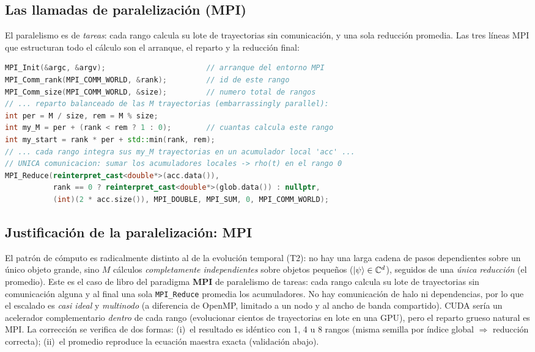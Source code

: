 \subsection{Las llamadas de paralelización (MPI)}
El paralelismo es de \emph{tareas}: cada rango calcula su lote de trayectorias sin
comunicación, y una sola reducción promedia. Las tres líneas MPI que estructuran
todo el cálculo son el arranque, el reparto y la reducción final:

\begin{lstlisting}[language=C++,caption={Esqueleto MPI de \texttt{trajectories\_mpi.cpp}: arranque e identificación del rango, reparto balanceado de las $M$ trayectorias entre rangos (sin comunicación), y la \emph{única} operación colectiva \texttt{MPI\_Reduce} que suma los acumuladores en el rango 0 (Paso~3, el promedio).},label={lst:t3_mpi}]
MPI_Init(&argc, &argv);                       // arranque del entorno MPI
MPI_Comm_rank(MPI_COMM_WORLD, &rank);         // id de este rango
MPI_Comm_size(MPI_COMM_WORLD, &size);         // numero total de rangos
// ... reparto balanceado de las M trayectorias (embarrassingly parallel):
int per = M / size, rem = M % size;
int my_M = per + (rank < rem ? 1 : 0);        // cuantas calcula este rango
int my_start = rank * per + std::min(rank, rem);
// ... cada rango integra sus my_M trayectorias en un acumulador local 'acc' ...
// UNICA comunicacion: sumar los acumuladores locales -> rho(t) en el rango 0
MPI_Reduce(reinterpret_cast<double*>(acc.data()),
           rank == 0 ? reinterpret_cast<double*>(glob.data()) : nullptr,
           (int)(2 * acc.size()), MPI_DOUBLE, MPI_SUM, 0, MPI_COMM_WORLD);
\end{lstlisting}

\subsection{Justificación de la paralelización: MPI}
El patrón de cómputo es radicalmente distinto al de la evolución temporal (T2):
no hay una larga cadena de pasos dependientes sobre un único objeto grande, sino
$M$ cálculos \emph{completamente independientes} sobre objetos pequeños
($\ket\psi\in\mathbb{C}^d$), seguidos de una \emph{única reducción} (el promedio).
Este es el caso de libro del paradigma \textbf{MPI} de paralelismo de tareas:
cada rango calcula su lote de trayectorias sin comunicación alguna y al final una
sola \texttt{MPI\_Reduce} promedia los acumuladores. No hay comunicación de halo
ni dependencias, por lo que el escalado es \emph{casi ideal} y \emph{multinodo}
(a diferencia de OpenMP, limitado a un nodo y al ancho de banda compartido).
CUDA sería un acelerador complementario \emph{dentro} de cada rango (evolucionar
cientos de trayectorias en lote en una GPU), pero el reparto grueso natural es
MPI. La corrección se verifica de dos formas: (i)~el resultado es idéntico con
1, 4 u 8 rangos (misma semilla por índice global $\Rightarrow$ reducción
correcta); (ii)~el promedio reproduce la ecuación maestra exacta (validación
abajo).

